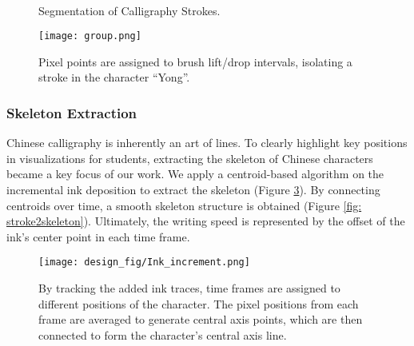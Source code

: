 

\begin{figure}[!htbp]
\centering
    \\
    \caption{Segmentation of Calligraphy Strokes.}
    \label{fig: image_of_min_charactor}
\end{figure}


\begin{figure}[!htbp]
    \centering
    \texttt{[image: group.png]}
    \caption{Pixel points are assigned to brush lift/drop intervals, isolating a stroke in the character ``Yong''.}
    \label{fig: strokepointsgroup}
\end{figure}





\subsubsection{Skeleton Extraction}
Chinese calligraphy is inherently an art of lines. To clearly highlight key positions in visualizations for students, extracting the skeleton of Chinese characters became a key focus of our work. 
We apply a centroid-based algorithm on the incremental ink deposition to extract the skeleton (Figure \ref{fig: Ink increment}). By connecting centroids over time, a smooth skeleton structure is obtained (Figure \ref{fig: stroke2skeleton}). Ultimately, the writing speed is represented by the offset of the ink's center point in each time frame.

\begin{figure}[H]
    \centering
    \texttt{[image: design\_fig/Ink\_increment.png]}
    \caption{By tracking the added ink traces, time frames are assigned to different positions of the character. The pixel positions from each frame are averaged to generate central axis points, which are then connected to form the character's central axis line.}
    \label{fig: Ink increment}
\end{figure}



